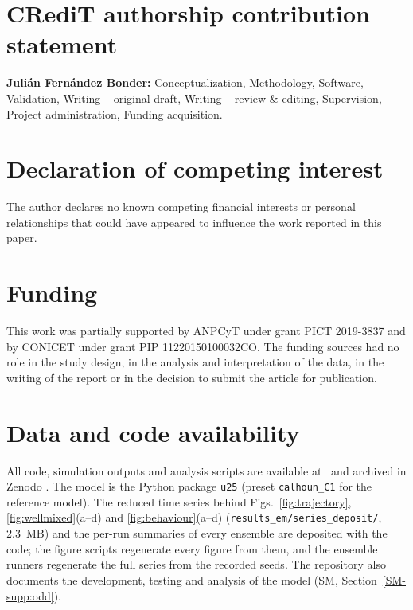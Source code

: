 \section*{CRediT authorship contribution statement}
\textbf{Juli\'an Fern\'andez Bonder:} Conceptualization, Methodology, Software, Validation, Writing -- original draft,
Writing -- review \& editing, Supervision, Project administration, Funding acquisition.

\section*{Declaration of competing interest}
The author declares no known competing financial interests or personal relationships that could have
appeared to influence the work reported in this paper.

\section*{Funding}
This work was partially supported by ANPCyT under grant PICT 2019-3837 and by CONICET under grant
PIP 11220150100032CO. The funding sources had no role in the study design, in the analysis and interpretation of
the data, in the writing of the report or in the decision to submit the article for publication.

\section*{Data and code availability}
{\sloppy All code, simulation outputs and analysis scripts are available at \repourl\ and archived in Zenodo
\citep{U25data}. The model is the Python package \texttt{u25} (preset \texttt{calhoun\_C1} for the reference
model). The reduced time series behind Figs.~\ref{fig:trajectory}, \ref{fig:wellmixed}(a--d) and
\ref{fig:behaviour}(a--d) (\texttt{results\_em/series\_deposit/}, 2.3~MB) and the per-run summaries of
every ensemble are deposited with the code; the figure scripts regenerate every figure from them, and the ensemble
runners regenerate the full series from the recorded seeds. The repository also documents the development, testing
and analysis of the model (SM, Section~\ref{SM-supp:odd}).\par}

